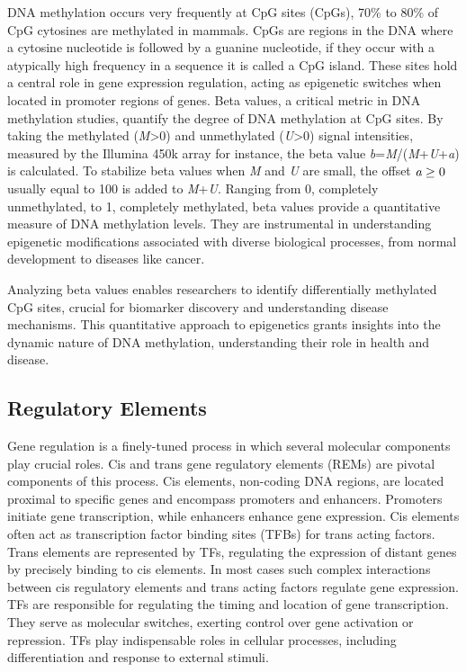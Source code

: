 \documentclass[pdftex,12pt,a4paper]{report}
\begin{document}
DNA methylation occurs very frequently at CpG sites (CpGs), 70\% to 80\% of CpG cytosines are methylated in mammals\cite{methylation_cpg}.
CpGs are regions in the DNA where a cytosine nucleotide is followed by a guanine nucleotide, if they occur with a atypically high frequency in a sequence it is called a CpG island\cite{cpgislandguide}.
These sites hold a central role in gene expression regulation, acting as epigenetic switches when located in promoter regions of genes\cite{cpgisland}. 
Beta values, a critical metric in DNA methylation studies, quantify the degree of DNA methylation at CpG sites. By taking the methylated (\emph{M}>0) and unmethylated (\emph{U}>0) signal intensities, measured by the Illumina 450k array for instance, the beta value \emph{b}=\emph{M}/(\emph{M}+\emph{U}+\emph{a}) is calculated. To stabilize beta values when \emph{M} and \emph{U} are small, the offset $\emph{a}\geq0$ usually equal to 100 is added to \emph{M}+\emph{U}. Ranging from 0, completely unmethylated, to 1, completely methylated, beta values provide a quantitative measure of DNA methylation levels. They are instrumental in understanding epigenetic modifications associated with diverse biological processes, from normal development to diseases like cancer\cite{mvalues}.

Analyzing beta values enables researchers to identify differentially methylated CpG sites, crucial for biomarker discovery and understanding disease mechanisms. This quantitative approach to epigenetics grants insights into the dynamic nature of DNA methylation, understanding their role in health and disease.
\subsection{Regulatory Elements}
Gene regulation is a finely-tuned process in which several molecular components play crucial roles. Cis and trans gene regulatory elements (REMs) are pivotal components of this process.
Cis elements, non-coding DNA regions, are located proximal to specific genes and encompass promoters and enhancers. Promoters initiate gene transcription, while enhancers enhance gene expression. Cis elements often act as transcription factor binding sites (TFBs) for trans acting factors\cite{rems_enhancers}.
Trans elements are represented by TFs, regulating the expression of distant genes by precisely binding to cis elements. In most cases such complex interactions between cis regulatory elements and trans acting factors regulate gene expression. TFs are responsible for regulating the timing and location of gene transcription\cite{rems_cis_trans}. They serve as molecular switches, exerting control over gene activation or repression. TFs play indispensable roles in cellular processes, including differentiation and response to external stimuli\cite{rems_enhancers}.
\end{document}
